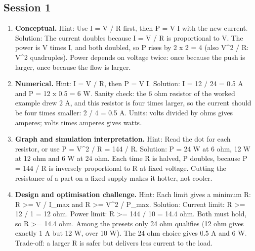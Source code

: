 \documentclass[11pt,a4paper]{article}
\begin{document}
\subsection*{Session 1}
\begin{enumerate}[nosep]
\item \textbf{Conceptual.} Hint: Use I = V / R first, then P = V I with the new current. Solution: The current doubles because I = V / R is proportional to V. The power is V times I, and both doubled, so P rises by 2 x 2 = 4 (also V\textasciicircum{}2 / R: V\textasciicircum{}2 quadruples). Power depends on voltage twice: once because the push is larger, once because the flow is larger.
\item \textbf{Numerical.} Hint: I = V / R, then P = V I. Solution: I = 12 / 24 = 0.5 A and P = 12 x 0.5 = 6 W. Sanity check: the 6 ohm resistor of the worked example drew 2 A, and this resistor is four times larger, so the current should be four times smaller: 2 / 4 = 0.5 A. Units: volts divided by ohms gives amperes; volts times amperes gives watts.
\item \textbf{Graph and simulation interpretation.} Hint: Read the dot for each resistor, or use P = V\textasciicircum{}2 / R = 144 / R. Solution: P = 24 W at 6 ohm, 12 W at 12 ohm and 6 W at 24 ohm. Each time R is halved, P doubles, because P = 144 / R is inversely proportional to R at fixed voltage. Cutting the resistance of a part on a fixed supply makes it hotter, not cooler.
\item \textbf{Design and optimisation challenge.} Hint: Each limit gives a minimum R: R \textgreater{}= V / I\_max and R \textgreater{}= V\textasciicircum{}2 / P\_max. Solution: Current limit: R \textgreater{}= 12 / 1 = 12 ohm. Power limit: R \textgreater{}= 144 / 10 = 14.4 ohm. Both must hold, so R \textgreater{}= 14.4 ohm. Among the presets only 24 ohm qualifies (12 ohm gives exactly 1 A but 12 W, over 10 W). The 24 ohm choice gives 0.5 A and 6 W. Trade-off: a larger R is safer but delivers less current to the load.
\end{enumerate}
\end{document}
